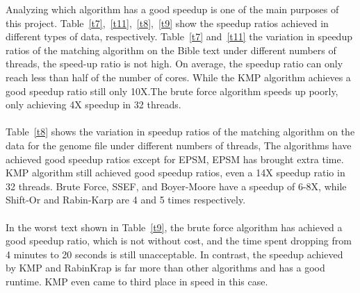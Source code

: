 \documentclass[11pt]{article}       %
\newcommand{\includeFig}[3]      {\begin{figure}[htb] \begin{center}
                                 \includegraphics
                                 [width=4in,keepaspectratio] %
                                 {#2}\caption{\label{#1}#3} \end{center} \end{figure}}
\begin{document}
Analyzing which algorithm has a good speedup is one of the main purposes of this project. Table~\ref{t7},~\ref{t11},~\ref{t8},~\ref{t9} show the speedup ratios achieved in different types of data, respectively. Table~\ref{t7} and~\ref{t11}  the variation in speedup ratios of the matching algorithm on the Bible text under different numbers of threads, the speed-up ratio is not high. On average, the speedup ratio can only reach less than half of the number of cores. While the KMP algorithm achieves a good speedup ratio still only 10X.The brute force algorithm speeds up poorly, only achieving 4X speedup in 32 threads.\\ 
\\Table~\ref{t8} shows the variation in speedup ratios of the matching algorithm on the data for the genome file under different numbers of threads, The algorithms have achieved good speedup ratios except for EPSM, EPSM has brought extra time. KMP algorithm still achieved good speedup ratios, even a 14X speedup ratio in 32 threads. Brute Force, SSEF, and Boyer-Moore have a speedup of 6-8X, while Shift-Or and Rabin-Karp are 4 and 5 times respectively.\\
\\In the worst text shown in Table~\ref{t9}, the brute force algorithm has achieved a good speedup ratio, which is not without cost, and the time spent dropping from 4 minutes to 20 seconds is still unacceptable. In contrast, the speedup achieved by KMP and RabinKrap is far more than other algorithms and has a good runtime. KMP even came to third place in speed in this case.






\end{document}
